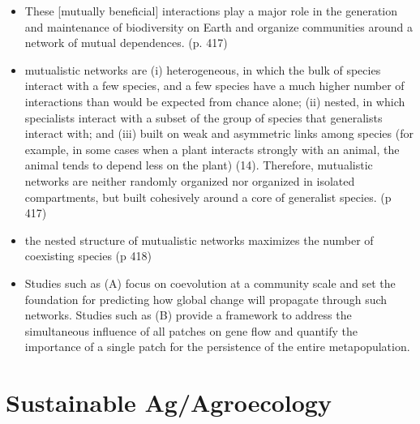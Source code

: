 \documentclass[twoside]{article}	%
\begin{document}
\begin{itemize}
  \item These [mutually beneficial] interactions play a major role in the generation and maintenance of biodiversity on Earth and organize communities around a network of mutual dependences. (p. 417)
  \item mutualistic networks are (i) heterogeneous, in which the bulk of species interact with a few species, and  a few species have a much higher number of interactions than would be expected from chance alone; (ii) nested, in which specialists interact with a subset of the group of species that generalists interact with; and (iii) built on weak and asymmetric links among species (for example, in some cases when a plant interacts strongly with an animal, the animal tends to depend less on the plant) (14). Therefore, mutualistic networks are neither randomly organized nor organized in isolated compartments, but built cohesively around a core of generalist species. (p 417)
  \item the nested structure of mutualistic networks maximizes the number of coexisting species (p 418)
  \item Studies such as (A) focus on coevolution at a community scale and set the foundation for predicting how global change will propagate through such networks. Studies such as (B) provide a framework to address the simultaneous influence of all patches on gene flow and quantify the importance of a single patch for the persistence of the entire metapopulation.
\end{itemize}



\section{Sustainable Ag/Agroecology}



\end{document}
